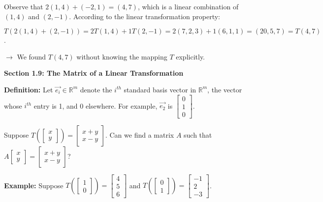 \documentclass{article}
\begin{document}
Observe that $2(1,4) + (-2,1) = (4,7)$, which is a linear combination of $(1,4)$ and $(2,-1)$. According to the linear transformation property:

\[ T(2(1,4)+(2,-1)) = 2T(1,4) + 1T(2,-1) = 2(7,2,3)+1(6,1,1) = (20,5,7) = T(4,7) \].

\(\rightarrow\) We found \( T(4,7) \) without knowing the mapping \( T \) explicitly.

\textbf{Section 1.9: The Matrix of a Linear Transformation}

\textbf{Definition:} Let \( \vec{e_i} \in \mathbb{R}^m \) denote the \( i^{th} \) standard basis vector in \( \mathbb{R}^m \), the vector whose \( i^{th} \) entry is 1, and 0 elsewhere. For example, \( \vec{e_2} \) is \( \begin{bmatrix} 0 \\ 1 \\ 0 \end{bmatrix} \).

Suppose \( T(\begin{bmatrix} x \\ y \end{bmatrix}) = \begin{bmatrix} x+y \\ x-y \end{bmatrix} \). Can we find a matrix \( A \) such that \( A\begin{bmatrix} x \\ y \end{bmatrix} = \begin{bmatrix} x+y \\ x-y \end{bmatrix} \)?

\textbf{Example:} Suppose \( T(\begin{bmatrix} 1 \\ 0 \end{bmatrix}) = \begin{bmatrix} 4 \\ 5 \\ 6 \end{bmatrix} \) and \( T(\begin{bmatrix} 0 \\ 1 \end{bmatrix}) = \begin{bmatrix} -1 \\ 2 \\ -3 \end{bmatrix} \).
\end{document}
